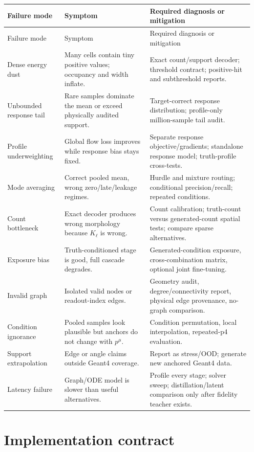 \documentclass[11pt]{article}
\theoremstyle{definition}
\theoremstyle{remark}
\begin{document}
\begin{longtable}{p{}p{}p{}}
\toprule
Failure mode & Symptom & Required diagnosis or mitigation \\
\midrule
\endfirsthead
\toprule
Failure mode & Symptom & Required diagnosis or mitigation \\
\midrule
\endhead
Dense energy dust & Many cells contain tiny positive values; occupancy and width inflate. & Exact count/support decoder; threshold contract; positive-hit and subthreshold reports. \\
Unbounded response tail & Rare samples dominate the mean or exceed physically audited support. & Target-correct response distribution; profile-only million-sample tail audit. \\
Profile underweighting & Global flow loss improves while response bias stays fixed. & Separate response objective/gradients; standalone response model; truth-profile cross-tests. \\
Mode averaging & Correct pooled mean, wrong zero/late/leakage regimes. & Hurdle and mixture routing; conditional precision/recall; repeated conditions. \\
Count bottleneck & Exact decoder produces wrong morphology because $K_\ell$ is wrong. & Count calibration; truth-count versus generated-count spatial tests; compare sparse alternatives. \\
Exposure bias & Truth-conditioned stage is good, full cascade degrades. & Generated-condition exposure, cross-combination matrix, optional joint fine-tuning. \\
Invalid graph & Isolated valid nodes or readout-index edges. & Geometry audit, degree/connectivity report, physical edge provenance, no-graph comparison. \\
Condition ignorance & Pooled samples look plausible but anchors do not change with $p^\mu$. & Condition permutation, local interpolation, repeated-p4 evaluation. \\
Support extrapolation & Edge or angle claims outside Geant4 coverage. & Report as stress/OOD; generate new anchored Geant4 data. \\
Latency failure & Graph/ODE model is slower than useful alternatives. & Profile every stage; solver sweep; distillation/latent comparison only after fidelity teacher exists. \\
\bottomrule
\end{longtable}

\section{Implementation contract}
\end{document}
